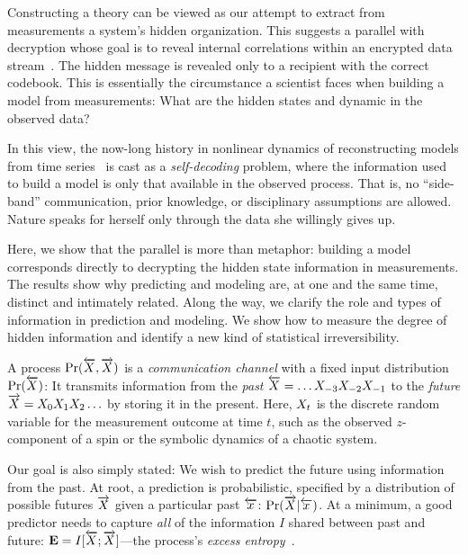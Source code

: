 \documentclass[prl,twocolumn,showpacs,superscriptaddress,preprintnumbers,floatfix]{revtex4}
\theoremstyle{plain}    \newtheorem{Lem}{Lemma}
\theoremstyle{plain}    \newtheorem*{ProLem}{Proof}
\theoremstyle{plain} 	\newtheorem{Cor}{Corollary}
\theoremstyle{plain} 	\newtheorem*{ProCor}{Proof}
\theoremstyle{plain} 	\newtheorem{The}{Theorem}
\theoremstyle{plain} 	\newtheorem*{ProThe}{Proof}
\theoremstyle{plain} 	\newtheorem{Prop}{Proposition}
\theoremstyle{plain} 	\newtheorem*{ProProp}{Proof}
\theoremstyle{plain} 	\newtheorem*{Conj}{Conjecture}
\theoremstyle{plain}	\newtheorem*{Rem}{Remark}
\theoremstyle{plain}	\newtheorem*{Def}{Definition}
\theoremstyle{plain}	\newtheorem*{Not}{Notation}
\begin{document}



Constructing a theory can be viewed as our attempt to extract from measurements
a system's hidden organization. This suggests a parallel with decryption whose
goal is to reveal internal correlations within an encrypted data
stream~\cite{Shan49a}. The hidden message is revealed only to a recipient with
the correct codebook. This is essentially the circumstance a scientist faces
when building a model from measurements: What are the hidden states and dynamic
in the observed data?

In this view, the now-long history in nonlinear dynamics of reconstructing 
models from time series~\cite{Kant06a,Spro03a} is cast as a \emph{self-decoding}
problem, where the information used to build a model is only that available in
the observed process. That is, no ``side-band'' communication, prior knowledge,
or disciplinary assumptions are allowed. Nature speaks for herself only through
the data she willingly gives up.

Here, we show that the parallel is more than metaphor: building a model
corresponds directly to decrypting the hidden state information in measurements.
The results show why predicting and modeling are, at one and the same time,
distinct and intimately related. Along the way, we clarify the role and types
of information in prediction and modeling. We show how to measure the degree
of hidden information and identify a new kind of statistical irreversibility.

A process ${\Pr}(\overleftarrow {{X}},\overrightarrow{{X}})$ is a \emph{communication channel} with
a fixed input distribution ${\Pr}(\overleftarrow {{X}})$:
It transmits information from the \emph{past}
$\overleftarrow {{X}} = \ldots {X}_{-3} {X}_{-2} {X}_{-1}$ to the
\emph{future} $\overrightarrow{{X}} = {X}_0 {X}_1 {X}_2 \ldots$
by storing it in the present. Here, ${X}_t$ is the discrete random
variable for the measurement outcome at time $t$, such as the observed
$z$-component of a spin or the symbolic dynamics of a chaotic system.

Our goal is also simply stated: We wish to
predict the future using information from the past. At root, a prediction is
probabilistic, specified by a distribution of possible futures $\overrightarrow{{X}}$
given a particular past ${\overleftarrow {{x}}}$: ${\Pr}(\overrightarrow{{X}}|{\overleftarrow {{x}}})$. At a minimum, a
good predictor needs to capture \emph{all} of the information $I$ shared
between past and future: ${\bf E} = I[\overleftarrow {{X}};\overrightarrow{{X}}]$---the process's
\emph{excess entropy}~\cite[and references therein]{Crut01a}.
\end{document}
